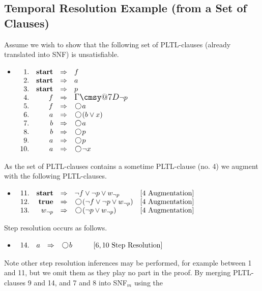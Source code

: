 \documentclass[nohyperref]{acmtrans2f}
\makeatletter
\def\sometime{\mathord{\hbox{\large$\mathchar"0\cmsy@7D$}}}
\newcommand{\next}{\!\raisebox{-.2ex}{ %
                        \mbox{\unitlength=0.9ex
                        \begin{picture}(2,2)
                        \linethickness{0.06ex}
                        \put(1,1){\circle{2}} %
                        \end{picture}}}       %
                        \,}
\let\imp=\Rightarrow
\def\ltrue{\hbox{\rm\bf true}}
\def\lstart{\hbox{\rm\bf start}}
\makeatother
\begin{document}
\subsection{Temporal Resolution Example (from a Set of Clauses)}
\label{eg.tr}
Assume we wish to show that the following set of PLTL-clauses (already translated
into SNF) is unsatisfiable.
\begin{itemize}
\item[] $\begin{array}[t]{rrcl}
1. & \lstart & \imp & f \\
2. & \lstart & \imp & a \\
3. & \lstart & \imp & p \\
4. & f & \imp & \sometime \neg p \\
5. & f & \imp & \next a \\
6. & a & \imp & \next (b \lor x) \\
7. & b & \imp & \next a \\
8. & b & \imp & \next p \\
9. & a & \imp & \next p \\
10. & a & \imp & \next \neg x
\end{array}$
\end{itemize}
%
As the set of PLTL-clauses contains a sometime PLTL-clause (no. 4) we
augment with the following PLTL-clauses.
\begin{itemize}
\item[]$\begin{array}[t]{rrcll}
11.& \lstart & \imp & \neg f \lor \neg p \lor w_{\neg p} &
[4 \mbox{ Augmentation}] \\
12. & \ltrue & \imp & \next( \neg f \lor \neg p \lor w_{\neg p}) &
[4 \mbox{ Augmentation}]   \\
13. & w_{\neg p} & \imp & \next(\neg p \lor w_{\neg p}) &
[4 \mbox{ Augmentation}]   \\
\end{array}$
\end{itemize}
Step resolution occurs as follows.
\begin{itemize}
\item[] $\begin{array}[t]{rrcll}
14.& a & \imp & \next b \qquad & [6,10 \mbox{ Step Resolution}] 
\end{array}$
\end{itemize}
%
Note other step resolution inferences may be performed, for example between
1 and 11, but we omit them as they play no part in the proof.
By merging PLTL-clauses 9 and 14, and 7 and 8 into SNF$_m$ using the
\end{document}
